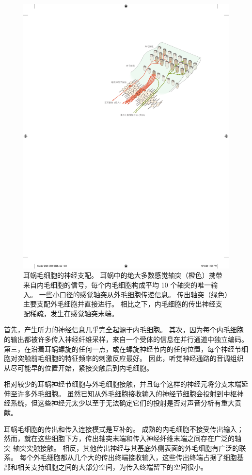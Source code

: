 \begin{figure}[htbp]
	\centering
	\includegraphics[width=0.8\linewidth]{chap26/fig_26_17}
	\caption{耳蜗毛细胞的神经支配。
		耳蜗中的绝大多数感觉轴突（橙色）携带来自内毛细胞的信号，每个内毛细胞构成平均 10 个轴突的唯一输入。
		一些小口径的感觉轴突从外毛细胞传递信息。
		传出轴突（绿色）主要支配外毛细胞并直接进行。
		相比之下，内毛细胞的传出神经支配稀疏，发生在感觉轴突末端\cite{spoendlin1974neuroanatomy}。}
	\label{fig:26_17}
\end{figure}


首先，产生听力的神经信息几乎完全起源于内毛细胞。
其次，因为每个内毛细胞的输出都被许多传入神经纤维采样，来自一个受体的信息在并行通道中独立编码。
第三，在沿着耳蜗螺旋的任何一点，或在螺旋神经节内的任何位置，每个神经节细胞对突触前毛细胞的特征频率的刺激反应最好。
因此，听觉神经通路的音调组织从尽可能早的位置开始，紧接突触后到内毛细胞。


相对较少的耳蜗神经节细胞与外毛细胞接触，并且每个这样的神经元将分支末端延伸至许多外毛细胞。
虽然已知从外毛细胞接收输入的神经节细胞会投射到中枢神经系统，但这些神经元太少以至于无法确定它们的投射是否对声音分析有重大贡献。


耳蜗毛细胞的传出和传入连接模式是互补的。
成熟的内毛细胞不接受传出输入；
然而，就在这些细胞下方，传出轴突末端和传入神经纤维末端之间存在广泛的轴突-轴突突触接触。
相反，其他传出神经与其基底外侧表面的外毛细胞有广泛的联系。
每个外毛细胞都从几个大的传出终端接收输入，这些传出终端占据了细胞基部和相关支持细胞之间的大部分空间，为传入终端留下的空间很小。



